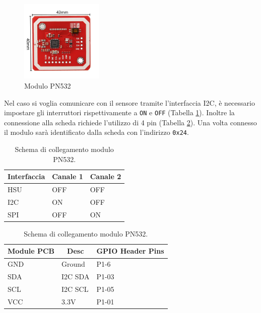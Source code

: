 \begin{figure}[H]
    \begin{center}
        \includegraphics[width=0.35\textwidth]{images/sensors/pn532.png}
    \end{center}
    \caption{\label{pn532}Modulo PN532}
\end{figure}

Nel caso si voglia comunicare con il sensore tramite l'interfaccia I2C, è necessario impostare gli interruttori rispettivamente a \texttt{ON} e \texttt{OFF} (Tabella \ref*{tb-PN532-interfaces}). Inoltre la connessione alla scheda richiede l'utilizzo di 4 pin (Tabella \ref*{tb-PN532-conn-schema}). Una volta connesso il modulo sarà identificato dalla scheda con l'indirizzo \texttt{0x24}.
\begin{table}[H]
    \centering
    \begin{tabular}{|l|l|l|}
    \hline
    \textbf{Interfaccia} & \textbf{Canale 1} & \textbf{Canale 2} \\ \hline
    HSU                  & OFF               & OFF               \\ \hline
    I2C                  & ON                & OFF               \\ \hline
    SPI                  & OFF               & ON                \\ \hline
    \end{tabular}
    \caption{\label{tb-PN532-interfaces}Schema di collegamento modulo PN532.}
\end{table}

\begin{table}[H]
    \centering
    \begin{tabular}{|l|l|l|}
    \hline
    \multicolumn{1}{|c|}{\textbf{Module PCB}} & \multicolumn{1}{c|}{\textbf{Desc}} & \multicolumn{1}{c|}{\textbf{GPIO Header Pins}} \\ \hline
    GND                                       & Ground                             & P1-6                                          \\ \hline
    SDA                                       & I2C SDA                            & P1-03                                          \\ \hline
    SCL                                       & I2C SCL                            & P1-05                                          \\ \hline
    VCC                                       & 3.3V                               & P1-01                                          \\ \hline
    \end{tabular}
    \caption{\label{tb-PN532-conn-schema}Schema di collegamento modulo PN532.}
\end{table}


